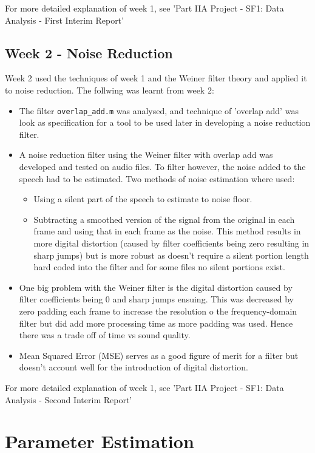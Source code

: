 \documentclass[12pt]{article}
\begin{document}
For more detailed explanation of week 1, see 'Part IIA Project - SF1: Data Analysis - First Interim Report'

\subsection{Week 2 - Noise Reduction}
Week 2 used the techniques of week 1 and the Weiner filter theory and applied it to noise reduction. The follwing was learnt from week 2:

\begin{itemize}
	\item The filter \texttt{overlap\_add.m} was analysed, and technique of 'overlap add' was look as specification for a tool to be used later in developing a noise reduction filter. 
	\item A noise reduction filter using the Weiner filter with overlap add was developed and tested on audio files. To filter however, the noise added to the speech had to be estimated. Two methods of noise estimation where used:
	\begin{itemize}
	\item Using a silent part of the speech to estimate to noise floor.
	\item Subtracting a smoothed version of the signal from the original in each frame and using that in each frame as the noise. This method results in more digital distortion (caused by filter coefficients being zero resulting in sharp jumps) but is more robust as doesn't require a silent portion length hard coded into the filter and for some files no silent portions exist.
	\end{itemize}
	\item One big problem with the Weiner filter is the digital distortion caused by filter coefficients being 0 and sharp jumps ensuing. This was decreased by zero padding each frame to increase the resolution o the frequency-domain filter but did add more processing time as more padding was used. Hence there was a trade off of time vs sound quality.
	\item Mean Squared Error (MSE) serves as a good figure of merit for a filter but doesn't account well for the introduction of digital distortion.   
\end{itemize}

For more detailed explanation of week 1, see 'Part IIA Project - SF1: Data Analysis - Second Interim Report'

\section{Parameter Estimation}
\end{document}
